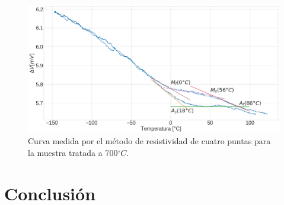 \documentclass[11pt]{beamer}
\begin{document}
		\begin{frame}
			\begin{figure}[H]
				\centering
				\includegraphics[scale=0.2]{img/Resistance_700.png}
				\caption*{Curva medida por el método de resistividad de cuatro puntas para la muestra tratada a 700$^\circ C$.}
				\label{Failures}
			\end{figure}
		\end{frame}
	

\section{Conclusión}
\end{document}
